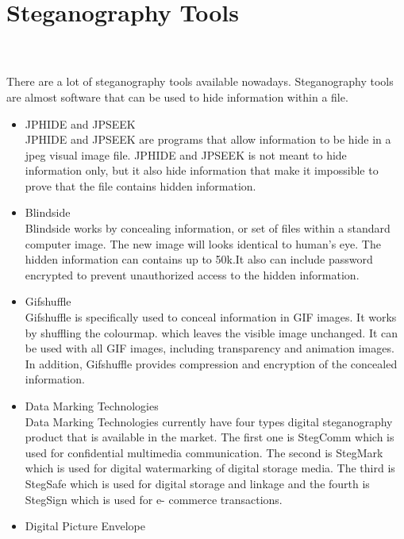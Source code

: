 \documentclass[conference, compsoc]{IEEEtran}
\begin{document}
\section{Steganography Tools}\\
\\
There are a lot of steganography tools available nowadays. Steganography tools are almost software that can be used to hide information within a file.\\
\begin{itemize}
\item JPHIDE and JPSEEK\\
      JPHIDE and JPSEEK are programs that allow information to be 	  hide in a jpeg visual image file. JPHIDE and JPSEEK is not 		  meant to hide information only, but it also hide 					  information that make it impossible to prove that the file 		  contains hidden information.\\
\item Blindside\\
	  Blindside works by concealing information, or set of files  	  within a standard computer image. The new image will looks 		  identical to human's eye. The hidden information can 				  contains up to 50k.It also can include password encrypted 		  to prevent unauthorized access to the hidden information.\\
\item Gifshuffle\\
      Gifshuffle is specifically used to conceal information in 		  GIF images. It works by shuffling the colourmap. which 			  leaves the visible image unchanged. It can be used with all 	  GIF images, including transparency and animation images. In 	  addition, Gifshuffle provides compression and encryption of 	  the concealed information.\\
\item Data Marking Technologies\\
      Data Marking Technologies currently have four types digital 	  steganography product that is available in the market. The 		  first one is StegComm which is used for confidential 				  multimedia communication. The second is StegMark which is   	  used for digital watermarking of digital storage media. The 	  third is StegSafe which is used for digital storage and 			  linkage and the fourth is StegSign which is used for e-			  commerce transactions.\\
\item Digital Picture Envelope\\

\end{itemize}
\end{document}
